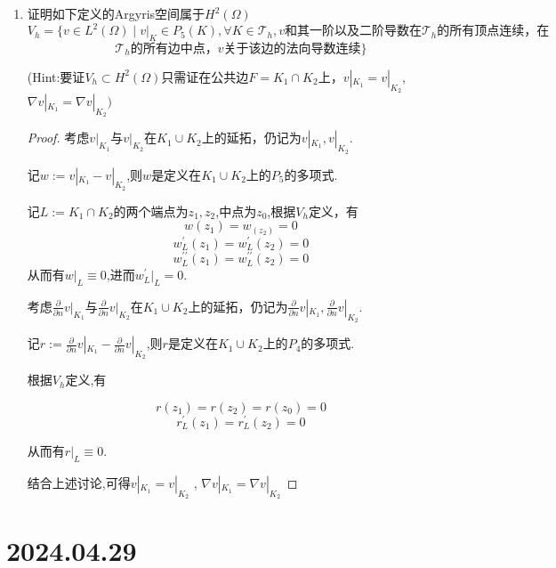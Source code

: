 \documentclass[12pt,a4paper]{article}
\begin{document}
\begin{enumerate}
		\item 证明如下定义的Argyris空间属于$H^2(\Omega)$ 
		$$V_h=\{v\in L^2(\Omega)\mid v|_K\in P_5(K),\forall K\in \mathcal{T}_h,v\text{和其一阶以及二阶导数在}\mathcal{T}_h
		\text{的所有顶点连续，在}$$
		$$\mathcal{T}_h\text{的所有边中点，}v\text{关于该边的法向导数连续}\}$$
		
		(Hint:要证$V_h\subset H^2(\Omega)$只需证在公共边$F=K_1\cap K_2$上，$v|_{K_1}=v|_{K_2}$, $\nabla v|_{K_1}=\nabla v|_{K_2})$
		
		\begin{proof}
			考虑$v|_{K_1}$与$v|_{K_2}$在$K_1\cup K_2$上的延拓，仍记为$v|_{K_1},v|_{K_2}$.
			
			记$w := v|_{K_1}-v|_{K_2}$,则$w$是定义在$K_1\cup K_2$上的$P_5$的多项式.
			
			记$L := K_1\cap K_2$的两个端点为$z_1,z_2$,中点为$z_0$,根据$V_h$定义，有
			$$
			w(z_1)=w_(z_2)=0
			$$
			$$
			w_{L}^{\prime}(z_1)=w_{L}^{\prime}(z_2)=0
			$$
			$$
			w_{L}^{\prime\prime}(z_1)=w_{L}^{\prime\prime}(z_2)=0
			$$
			从而有$w|_{L}\equiv0$,进而$w_L^\prime|_L=0$.
			
			考虑$\frac{\partial}{\partial n} v|_{K_1}$与$\frac{\partial}{\partial n} v|_{K_2}$在$K_1\cup K_2$上的延拓，仍记为$\frac{\partial}{\partial n} v|_{K_1},\frac{\partial}{\partial n} v|_{K_2}$.
			
			记$r:=\frac{\partial}{\partial n} v|_{K_1}-\frac{\partial}{\partial n} v|_{K_2}$,则$r$是定义在$K_1\cup K_2$上的$P_4$的多项式.
			
			根据$V_h$定义,有
			
			$$r(z_1)=r(z_2)=r(z_0)=0$$
			$$r_L^\prime(z_1)=r_L^\prime(z_2)=0$$
			
			从而有$r|_{L}\equiv0$.
			
			结合上述讨论,可得$v|_{K_1}=v|_{K_2}$ , $\nabla v|_{K_1}=\nabla v|_{K_2}$
		\end{proof}
	\end{enumerate}
	
	\newpage
	
	\section*{2024.04.29}	
	
\end{document}
